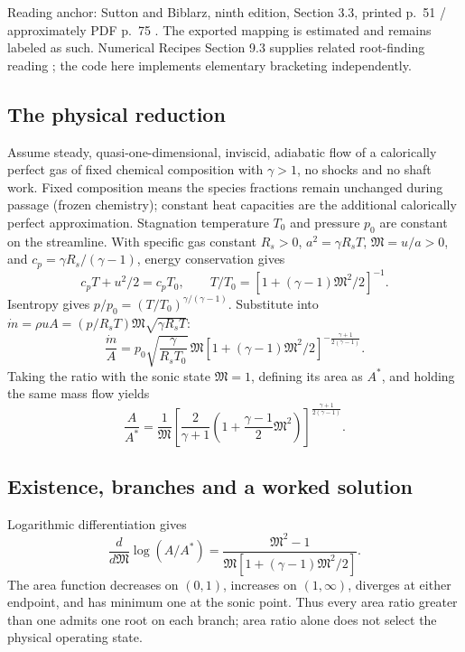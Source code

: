 Reading anchor: Sutton and Biblarz, ninth edition, Section 3.3, printed
p.~51 / approximately PDF p.~75 \cite{sutton}. The exported mapping is
estimated and remains labeled as such. Numerical Recipes Section 9.3 supplies
related root-finding reading \cite{nr}; the code here implements elementary
bracketing independently.

\subsection{The physical reduction}
Assume steady, quasi-one-dimensional, inviscid, adiabatic flow of a calorically
perfect gas of fixed chemical composition with $\gamma>1$, no shocks
and no shaft work. Fixed composition means the species fractions remain
unchanged during passage (frozen chemistry); constant heat capacities
are the additional calorically perfect approximation. Stagnation temperature
$T_0$ and pressure $p_0$ are constant on the streamline. With specific gas
constant $R_s>0$, $a^2=\gamma R_sT$, $\mathfrak M=u/a>0$, and
$c_p=\gamma R_s/(\gamma-1)$, energy conservation gives
\[
 c_pT+u^2/2=c_pT_0,\qquad T/T_0=[1+(\gamma-1)\mathfrak M^2/2]^{-1}.
\]
Isentropy gives $p/p_0=(T/T_0)^{\gamma/(\gamma-1)}$.
Substitute into $\dot m=\rho uA=(p/R_sT)\mathfrak M\sqrt{\gamma R_sT}$:
\[
 \frac{\dot m}{A}=p_0\sqrt{\frac{\gamma}{R_sT_0}}\,
 \mathfrak M[1+(\gamma-1)\mathfrak M^2/2]^{-\frac{\gamma+1}{2(\gamma-1)}}.
\]
Taking the ratio with the sonic state $\mathfrak M=1$, defining its area as $A^*$,
and holding the same mass flow yields
\begin{equation}\label{eq:area-mach}
 \frac{A}{A^*}=\frac1{\mathfrak M}\left[\frac{2}{\gamma+1}
    \left(1+\frac{\gamma-1}{2}\mathfrak M^2\right)\right]^{\frac{\gamma+1}{2(\gamma-1)}}.
\end{equation}

\subsection{Existence, branches and a worked solution}
Logarithmic differentiation gives
\[
 \frac{d}{d\mathfrak M}\log(A/A^*)=\frac{\mathfrak M^2-1}{\mathfrak M[1+(\gamma-1)\mathfrak M^2/2]}.
\]
The area function decreases on $(0,1)$, increases on $(1,\infty)$,
diverges at either endpoint, and has minimum one at the sonic point.
Thus every area ratio greater than one admits one root on each branch;
area ratio alone does not select the physical operating state.

